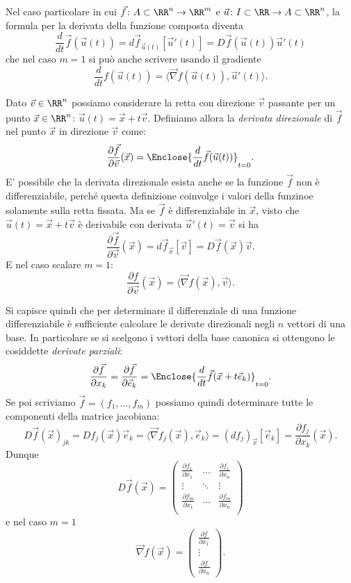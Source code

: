 Nel caso particolare in cui 
$\vec f\colon A\subset \RR^n \to \RR^m$ e $\vec u\colon I\subset \RR\to A\subset \RR^n$,
la formula per la derivata della funzione composta diventa
\[
  \frac{d}{dt} \vec f(\vec u(t))
  = d\vec f_{\vec u(t)}[\vec u'(t)]
  = D\vec f(\vec u(t))\vec u'(t)
\]
che nel caso $m=1$ si può anche scrivere usando il gradiente
\[
  \frac{d}{dt} f(\vec u(t))
  = \langle \vec\nabla f(\vec u(t)),\vec u'(t)\rangle.
\]

Dato $\vec v\in\RR^n$ possiamo considerare la retta con direzione $\vec v$
passante per un punto $\vec x\in \RR^n$: $\vec u(t) = \vec x + t\vec v$.
Definiamo allora la \emph{derivata direzionale} di $\vec f$ nel punto $\vec x$
in direzione $\vec v$ come:
\[
   \frac{\partial \vec f}{\partial \vec v}(\vec x)
   = \Enclose{\frac {d}{dt} \vec f(\vec u(t))}_{t=0}.
\]
E' possibile che la derivata direzionale esista anche se la funzione $\vec f$ 
non è differenziabile, perché questa definizione coinvolge i valori della funzinoe 
solamente sulla retta fissata.
Ma se $\vec f$ è differenziabile in $\vec x$, visto che $\vec u(t)=\vec x + t\vec v$ 
è derivabile con derivata $\vec u'(t) = \vec v$ si ha 
\[
  \frac{\partial \vec f}{\partial \vec v} (\vec x)
  = d\vec f_{\vec x}[\vec v]
  = D\vec f(\vec x) \vec v.
\]
E nel caso scalare $m=1$:
\[
  \frac{\partial f}{\partial \vec v} (\vec x)
  = \langle \vec\nabla f(\vec x), \vec v\rangle.
\]

Si capisce quindi che per determinare il differenziale di una funzione 
differenziabile è sufficiente 
calcolare le derivate direzionali negli $n$ vettori di una base.
In particolare se si scelgono i vettori della base canonica si ottengono
le cosiddette \emph{derivate parziali}:
\[
   \frac{\partial \vec f}{\partial x_k} 
   = \frac{\partial \vec f}{\partial \vec e_k}
   = \Enclose{\frac{d}{dt} \vec f(\vec x + t\vec e_k)}_{t=0}.
\]
Se poi scriviamo $\vec f = (f_1,\dots,f_m)$ possiamo quindi 
determinare tutte le componenti della matrice jacobiana:
\[
  D\vec f(\vec x)_{jk} = D f_j(\vec x) \vec e_k
  = \langle \vec\nabla f_j(\vec x),\vec e_k\rangle
  = (d f_j)_{\vec x}[\vec e_k]
  = \frac{\partial f_j}{\partial x_k}(\vec x).
\]
Dunque 
\[
  D\vec f(\vec x) = \begin{pmatrix}
    \frac{\partial f_1}{\partial x_1} & \dots & \frac{\partial f_1}{\partial x_n}\\
    \vdots & \ddots & \vdots \\
    \frac{\partial f_m}{\partial x_1} & \dots & \frac{\partial f_m}{\partial x_n}\\
  \end{pmatrix}
\]
e nel caso $m=1$ 
\[
  \vec\nabla f (\vec x) = \begin{pmatrix}
    \frac{\partial f}{\partial x_1}\\
    \vdots\\
    \frac{\partial f}{\partial x_n}
  \end{pmatrix}.
\]

